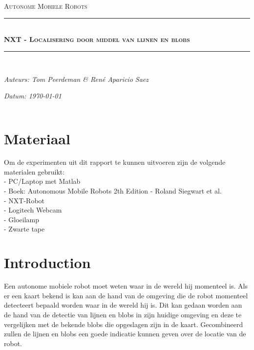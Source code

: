 \documentclass[a4paper]{article}
\newcommand{\HRule}{\rule{\linewidth}{0.5mm}}
\begin{document}
\begin{titlepage}
\begin{center}
\textsc{\Large Autonome Mobiele Robots}\\[0.5cm]
\HRule \\[0,4cm]
\textsc{\huge \bfseries NXT - Localisering door middel van lijnen en blobs}
\HRule \\[8cm]
\begin{minipage}{0.4\textwidth}
\begin{flushleft}\large
\emph{Auteurs: Tom Peerdeman \& Ren\'e Aparicio Saez}\\
\end{flushleft}
\end{minipage}
\begin{minipage}{0.4\textwidth}
\begin{flushright}\large
\emph{Datum: \today\\\hspace{1cm}}\\
\end{flushright}
\end{minipage}
\end{center}
\end{titlepage}

\section{Materiaal}
Om de experimenten uit dit rapport te kunnen uitvoeren zijn de volgende materialen gebruikt:\\
- PC/Laptop met Matlab\\
- Boek: Autonomous Mobile Robots 2th Edition - Roland Siegwart et al.\\
- NXT-Robot\\
- Logitech Webcam\\
- Gloeilamp\\
- Zwarte tape

\section{Introduction}
Een autonome mobiele robot moet weten waar in de wereld hij momenteel is. Als er een kaart bekend is kan aan de hand van de omgeving die de robot momenteel detecteert bepaald worden waar in de wereld hij is. Dit kan gedaan worden aan de hand van de detectie van lijnen en blobs in zijn huidige omgeving en deze te vergelijken met de bekende blobs die opgeslagen zijn in de kaart. Gecombineerd zullen de lijnen en blobs een goede indicatie kunnen geven over de locatie van de robot.
\end{document}
